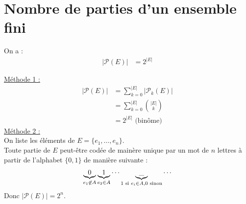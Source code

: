 \documentclass[../main.tex]{subfiles}
\begin{document}
\section{Nombre de parties d'un ensemble fini}
\begin{tcolorbox}[title=Théorème 31.49, title filled=false, colframe=orange, colback=orange!10!white]
    On a : 
    \begin{align*}
        |\mathcal{P}(E)| &= 2^{|E|}
    \end{align*}
\end{tcolorbox}

\noindent\underline{Méthode 1 :} \\
\begin{align*}
    |\mathcal{P}(E)| &= \sum_{k=0}^{|E|} |\mathcal{P}_k(E)| \\
    &= \sum_{k=0}^{|E|} \binom{|E|}{k} \\
    &= 2^{|E|} \text{ (binôme)} 
\end{align*}
\noindent\underline{Méthode 2 :} \\
On liste les éléments de $E = \{ e_1, \ldots, e_n \}$. \\
Toute partie de $E$ peut-être codée de mainère unique par un mot de $n$ lettres à partir de l'alphabet $\{0, 1\}$ de manière suivante : 
\begin{align*}
    \underbrace{0}_{e_1\not\in A} \space \underbrace{1}_{e_2\in A} \space \cdots \space \underbrace{\_}_{1 \text{ si } e_i\in A, 0 \text{ sinon}} \space \cdots 
\end{align*}
Donc $|\mathcal{P}(E)| = 2^n$.
\end{document}
